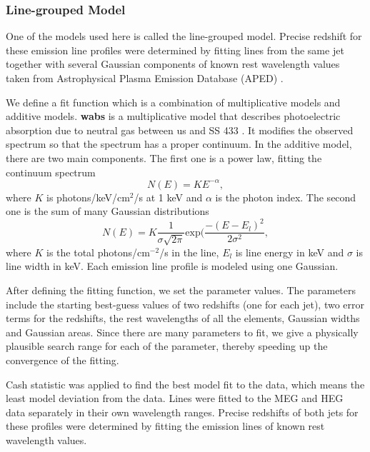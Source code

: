 \subsubsection{Line-grouped Model}
One of the models used here is called the line-grouped model. Precise redshift for these emission line profiles were determined by fitting lines from the same jet together with several Gaussian components of known rest wavelength values taken from Astrophysical Plasma Emission Database (APED) \citep{smith2001}.\par
We define a fit function which is a combination of multiplicative models and additive models. \textbf{wabs} is a multiplicative model that describes photoelectric absorption due to neutral gas between us and SS 433 \citep{Arnaud1999}. It modifies the observed spectrum so that the spectrum has a proper continuum. In the additive model, there are two main components. The first one is a power law, fitting the continuum spectrum 
\begin{equation}
     N(E) = KE^{-\alpha},
     \label{powerlaweq}
\end{equation}
where $K$ is photons/keV/cm$^2$/s at 1 keV and $\alpha$ is the photon index. The second one is the sum of many Gaussian distributions
\begin{equation}
     N(E) = K\dfrac{1}{\sigma \sqrt{2\pi}}\mathrm{exp}(\dfrac{-(E-E_l)^2}{2\sigma^2}, 
\end{equation}
where $K$ is the total photons/cm$^{-2}$/s in the line, $E_l$ is line energy in keV and $\sigma$ is line width in keV. Each emission line profile is modeled using one Gaussian.\par 

After defining the fitting function, we set the parameter values. The parameters include the starting best-guess values of two redshifts (one for each jet), two error terms for the redshifts, the rest wavelengths of all the elements, Gaussian widths and Gaussian areas. Since there are many parameters to fit, we give a physically plausible search range for each of the parameter, thereby speeding up the convergence of the fitting. \par 

Cash statistic was applied to find the best model fit to the data, which means the least model deviation from the data. Lines were fitted to the MEG and HEG data separately in their own wavelength ranges. Precise redshifts of both jets for these profiles were determined by fitting the emission lines of known rest wavelength values.\par


